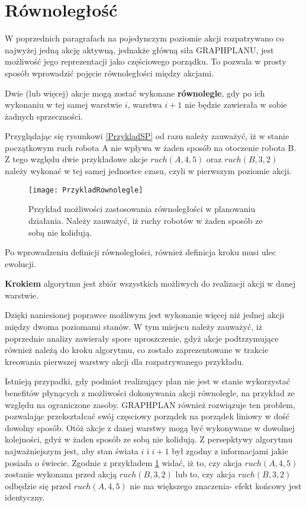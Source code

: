     \section{Równoległość}
    \label{Rownoleglosc}
    W poprzednich paragrafach na pojedynczym poziomie akcji rozpatrywano co najwyżej jedną akcję aktywną, jednakże główną siła GRAPHPLANU, jest 
    możliwość jego reprezentacji jako częściowego porządku. To pozwala w prosty sposób wprowadzić pojęcie równoległości między akcjami. 
    \begin{definition}
        \label{Warstwa}
        Dwie (lub więcej) akcje  mogą zostać wykonane \textbf{równolegle}, gdy po ich wykonaniu w tej samej warstwie $i$, warstwa $i+1$ nie będzie 
        zawierała w sobie żadnych sprzeczności.
    \end{definition}
    Przyglądając się rysunkowi \ref{PrzykladSP} od razu należy zauważyć, iż w stanie początkowym ruch robota A nie wpływa w żaden sposób na otoczenie
    robota B. Z tego względu dwie przykładowe akcje $ruch(A,4,5)$ oraz $ruch(B,3,2)$ należy wykonać w tej samej jednostce czasu, czyli w pierwszym
    poziomie akcji. 
    \begin{figure}[H]
        \texttt{[image: PrzykladRownolegle]}
        \centering
        \caption{Przykład możliwości zastosowania równoległości w planowaniu działania. Należy zauważyć, iż ruchy robotów w żaden sposób ze sobą
        nie kolidują.}
        \label{PrzykladRownolegle}
    \end{figure}
    
    Po wprowadzeniu definicji równoległości, również definicja kroku musi ulec ewolucji. 
    \begin{definition}
        \label{Krok}
        \textbf{Krokiem} algorytmu jest zbiór wszystkich możliwych do realizacji akcji w danej warstwie.
    \end{definition}
    Dzięki naniesionej poprawce możliwym jest wykonanie więcej niż jednej akcji między dwoma poziomami stanów. W tym miejscu należy 
    zauważyć, iż poprzednie analizy zawierały spore uproszczenie, gdyż akcje podtrzymujące również należą do kroku algorytmu, co zostało zaprezentowane
    w trakcie kreowania pierwszej warstwy akcji dla rozpatrywanego przykładu. 

    Istnieją przypadki, gdy podmiot realizujący plan nie jest w stanie wykorzystać benefitów płynących z możliwości dokonywania akcji równolegle, 
    na przykład ze względu na ograniczone zasoby. GRAPHPLAN również rozwiązuje ten problem, pozwalając przekształcać swój częsciowy porządek 
    na porządek liniowy w dość dowolny sposób. Otóż akcje z danej warstwy mogą być wykonywane w dowolnej kolejności, gdyż w żaden sposób ze sobą nie 
    kolidują. Z persepktywy algorytmu najważniejszym jest, aby stan świata $i$ i $i+1$ był zgodny z informacjami jakie posiada o świecie. Zgodnie z
    przykładem \ref{PrzykladRownolegle} widać, iż to, czy akcja $ruch(A,4,5)$ zostanie wykonana przed akcją $ruch(B,3,2)$ lub to, czy akcja 
    $ruch(B,3,2)$ odbędzie się przed $ruch(A,4,5)$ nie ma większego znaczenia- efekt końcowy jest identyczny.

